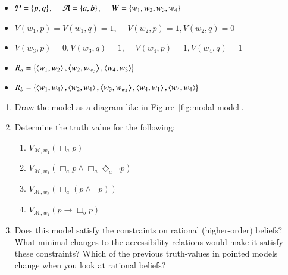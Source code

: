 \documentclass[nobib,nofonts]{tufte-handout}
\newcommand{\Model}{\ensuremath{\mathcal{M}}}
\begin{document}
{\begin{minipage}{1.0\textwidth}
\begin{exercise}
      \begin{itemize}[]
        \item $\mathcal{P} = \left\{p,q\right\}$, \ \ $\mathcal{A} = \left\{a, b\right\}$, \ \  $W = \left\{w_1, w_{2}, w_{3}, w_{4}\right\}$
        \item $V(w_{1},p) = V(w_{1},q) = 1$, \ \ $V(w_{2},p) =1,  V(w_{2},q) = 0$
        \item  $V(w_{3},p) =0,  V(w_{3},q) = 1$, \ \ $V(w_{4},p) =1,  V(w_{4},q) = 1$
        \item $R_{a} = \left\{
        \left \langle w_{1}, w_{2}\right\rangle,
        \left \langle w_{2}, w_{w_{3}}\right\rangle,
        \left \langle w_{4}, w_{3}\right\rangle
        \right\}$
        \item $R_{b} = \left\{
        \left \langle w_{1},w_{4}\right\rangle,
        \left \langle w_{2}, w_{4}\right\rangle,
        \left \langle w_{3}, w_{w_{4}}\right\rangle,
        \left \langle w_{4},w_{1}\right\rangle, \left \langle w_{4},w_{4}\right\rangle
        \right\}$
      \end{itemize}
      \begin{enumerate}
        \item Draw the model as a diagram like in Figure~\ref{fig:modal-model}.
        \item Determine the truth value for the following:
        \vspace{-0.3cm}
        \begin{multicols}{2}
          \begin{enumerate}[a]
            \item $V_{\Model, w_{1}}(\Box_{a} p)$
            \item $V_{\Model, w_{1}}(\Box_{a} p \wedge \Box_{a} \Diamond_{a} \neg p)$
            \item $V_{\Model, w_{3}}(\Box_{a} (p \wedge \neg p))$
            \item $V_{\Model, w_{4}}(p \rightarrow \Box_{b} p )$
          \end{enumerate}
        \end{multicols}
        \item Does this model satisfy the constraints on rational (higher-order) beliefs?
        What minimal changes to the accessibility relations would make it satisfy these constraints?
        Which of the previous truth-values in pointed models change when you look at rational beliefs?
      \end{enumerate}
    \end{exercise}

  \end{minipage}
}

\newpage
\end{document}
